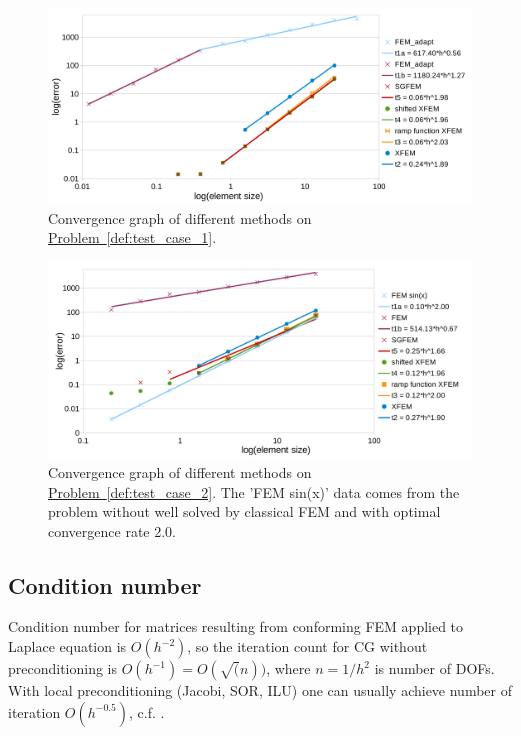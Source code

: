 \documentclass[preprint,12pt]{elsarticle}
\newcommand{\probref}[1]{\hyperref[#1]{Problem~\ref{#1}}}
\begin{document}
\begin{figure}[!htb]
  \centering    
  \includegraphics[width=\textwidth]{results/convergence.pdf}
  \caption[Convergence graph \probref{def:test_case_1}]{Convergence graph of different methods on 
  \probref{def:test_case_1}. }
  \label{fig:convergence}
\end{figure}
\begin{figure}[!htb]
  \centering    
  \includegraphics[width=\textwidth]{results/convergence_sin.pdf}
  \caption[Convergence graph \probref{def:test_case_2}]{Convergence graph of different methods on 
  \probref{def:test_case_2}. The 'FEM sin(x)'
  data comes from the problem without well solved by classical FEM and with optimal convergence rate 2.0.}
  \label{fig:convergence_sin}
\end{figure}

\subsection{Condition number}
Condition number for matrices resulting from conforming FEM applied to Laplace equation is $O(h^{-2})$, so the iteration count 
for CG without preconditioning is $O(h^{-1})=O(\sqrt(n))$, where $n=1/h^2$ is number of DOFs. With local preconditioning (Jacobi, 
SOR, ILU) one can usually achieve number of iteration $O(h^{-0.5})$, c.f. \cite{ern_evaluation_2006}.
\end{document}

